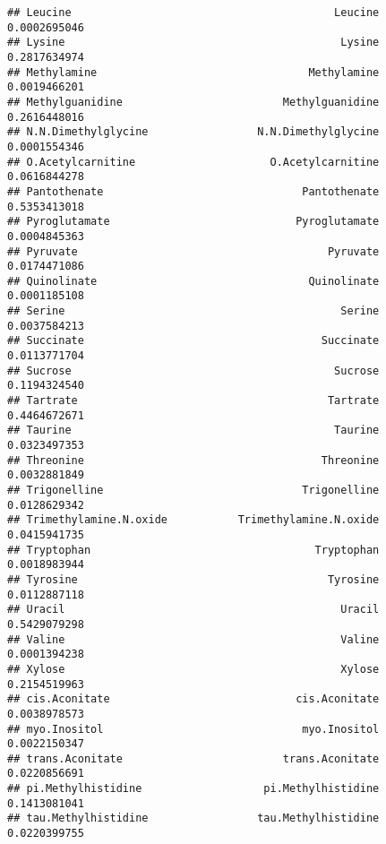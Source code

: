 \documentclass[
]{article}
\newenvironment{Shaded}{\begin{snugshade}}{\end{snugshade}}
\newcommand{\CommentTok}[1]{\textcolor[rgb]{0.56,0.35,0.01}{\textit{#1}}}
\newcommand{\FloatTok}[1]{\textcolor[rgb]{0.00,0.00,0.81}{#1}}
\newcommand{\NormalTok}[1]{#1}
\newcommand{\OtherTok}[1]{\textcolor[rgb]{0.56,0.35,0.01}{#1}}
\newcommand{\SpecialCharTok}[1]{\textcolor[rgb]{0.81,0.36,0.00}{\textbf{#1}}}
\begin{document}
\begin{verbatim}
## Leucine                                         Leucine 0.0002695046
## Lysine                                           Lysine 0.2817634974
## Methylamine                                 Methylamine 0.0019466201
## Methylguanidine                         Methylguanidine 0.2616448016
## N.N.Dimethylglycine                 N.N.Dimethylglycine 0.0001554346
## O.Acetylcarnitine                     O.Acetylcarnitine 0.0616844278
## Pantothenate                               Pantothenate 0.5353413018
## Pyroglutamate                             Pyroglutamate 0.0004845363
## Pyruvate                                       Pyruvate 0.0174471086
## Quinolinate                                 Quinolinate 0.0001185108
## Serine                                           Serine 0.0037584213
## Succinate                                     Succinate 0.0113771704
## Sucrose                                         Sucrose 0.1194324540
## Tartrate                                       Tartrate 0.4464672671
## Taurine                                         Taurine 0.0323497353
## Threonine                                     Threonine 0.0032881849
## Trigonelline                               Trigonelline 0.0128629342
## Trimethylamine.N.oxide           Trimethylamine.N.oxide 0.0415941735
## Tryptophan                                   Tryptophan 0.0018983944
## Tyrosine                                       Tyrosine 0.0112887118
## Uracil                                           Uracil 0.5429079298
## Valine                                           Valine 0.0001394238
## Xylose                                           Xylose 0.2154519963
## cis.Aconitate                             cis.Aconitate 0.0038978573
## myo.Inositol                               myo.Inositol 0.0022150347
## trans.Aconitate                         trans.Aconitate 0.0220856691
## pi.Methylhistidine                   pi.Methylhistidine 0.1413081041
## tau.Methylhistidine                 tau.Methylhistidine 0.0220399755
\end{verbatim}

\begin{Shaded}
\end{Shaded}
\end{document}
